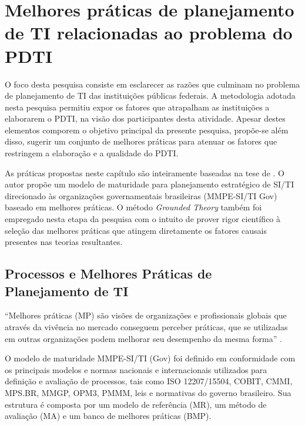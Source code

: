 \chapter{Melhores práticas de planejamento de TI relacionadas ao problema do PDTI}
\label{capitulo:proposta_mp}

O foco desta pesquisa consiste em esclarecer as razões que culminam no problema de planejamento de TI das instituições públicas federais. A metodologia adotada nesta pesquisa permitiu expor os fatores que atrapalham as instituições a elaborarem o PDTI, na visão dos participantes desta atividade. Apesar destes elementos comporem o objetivo principal da presente pesquisa, propõe-se além disso, sugerir um conjunto de melhores práticas para atenuar os fatores que restringem a elaboração e a qualidade do PDTI.

As práticas propostas neste capítulo são inteiramente baseadas na tese de . O autor propõe um modelo de maturidade para planejamento estratégico de SI/TI direcionado às organizações governamentais brasileiras (MMPE-SI/TI Gov) baseado em melhores práticas. O método \textit{Grounded Theory} também foi empregado nesta etapa da pesquisa com o intuito de prover rigor científico à seleção das melhores práticas que atingem diretamente os fatores causais presentes nas teorias resultantes.


\section{Processos e Melhores Práticas de Planejamento de TI}
\label{secao:melhores_praticas}
``Melhores práticas (MP) são visões de organizações e profissionais globais que através da vivência no mercado conseguem perceber práticas, que se utilizadas em outras organizações podem melhorar seu desempenho da mesma forma'' .

O modelo de maturidade MMPE-SI/TI (Gov) foi definido em conformidade com os principais modelos e normas nacionais e internacionais utilizados para definição e avaliação de processos, tais como ISO 12207/15504, COBIT, CMMI, MPS.BR, MMGP, OPM3, PMMM, leis e normativas do governo brasileiro. Sua estrutura é composta por um modelo de referência (MR), um método de avaliação (MA) e um banco de melhores práticas (BMP). 

